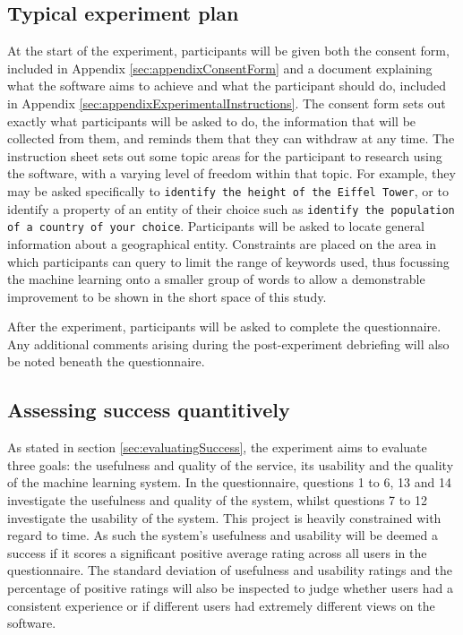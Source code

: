 \documentclass[authoryearcitations]{UoYCSproject}
\begin{document}
\subsection{Typical experiment plan}
\label{subsec:typicalExperiment}
At the start of the experiment, participants will be given both the consent form, included in Appendix \ref{sec:appendixConsentForm} and a document explaining what the software aims to achieve and what the participant should do, included in Appendix \ref{sec:appendixExperimentalInstructions}. The consent form sets out exactly what participants will be asked to do, the information that will be collected from them, and reminds them that they can withdraw at any time. The instruction sheet sets out some topic areas for the participant to research using the software, with a varying level of freedom within that topic. For example, they may be asked specifically to \texttt{identify the height of the Eiffel Tower}, or to identify a property of an entity of their choice such as \texttt{identify the population of a country of your choice}. Participants will be asked to locate general information about a geographical entity. Constraints are placed on the area in which participants can query to limit the range of keywords used, thus focussing the machine learning onto a smaller group of words to allow a demonstrable improvement to be shown in the short space of this study.

After the experiment, participants will be asked to complete the questionnaire. Any additional comments arising during the post-experiment debriefing will also be noted beneath the questionnaire.

\subsection{Assessing success quantitively}
\label{subsec:assessingLearning}
As stated in section \ref{sec:evaluatingSuccess}, the experiment aims to evaluate three goals: the usefulness and quality of the service, its usability and the quality of the machine learning system. In the questionnaire, questions 1 to 6, 13 and 14 investigate the usefulness and quality of the system, whilst questions 7 to 12 investigate the usability of the system. This project is heavily constrained with regard to time. As such the system's usefulness and usability will be deemed a success if it scores a significant positive average rating across all users in the questionnaire. The standard deviation of usefulness and usability ratings and the percentage of positive ratings will also be inspected to judge whether users had a consistent experience or if different users had extremely different views on the software.
\end{document}
